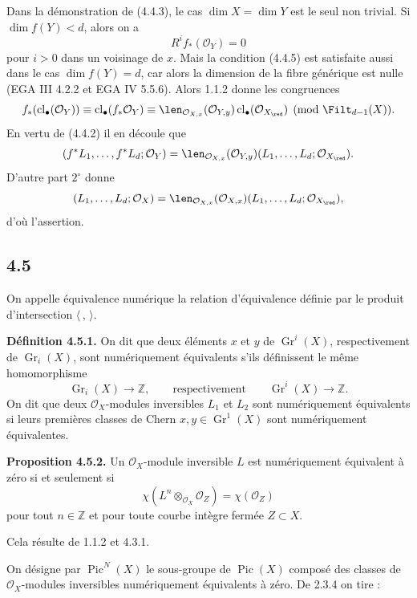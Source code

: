 \documentclass[11pt]{article}
\newcommand{\Gr}{\operatorname{Gr}}
\newcommand{\cl}{\operatorname{cl}}
\providecommand{\Pic}{\operatorname{Pic}}
\providecommand{\Gr}{\operatorname{Gr}}
\providecommand{\Gr}{\operatorname{G}}
\begin{document}
Dans la démonstration de (4.4.3), le cas \(\dim X=\dim Y\) est le seul non trivial. Si \(\dim f(Y)<d\), alors on a
\begin{equation}\tag{4.4.5}
 R^if_*(\mathcal O_Y)=0
\end{equation}
pour \(i>0\) dans un voisinage de \(x\). Mais la condition (4.4.5) est satisfaite aussi dans le cas \(\dim f(Y)=d\), car alors la dimension de la fibre générique est nulle (EGA III 4.2.2 et EGA IV 5.5.6). Alors 1.1.2 donne les congruences
\[
 f_*(\cl_\bullet(\mathcal O_Y))
 \equiv \cl_\bullet(f_*\mathcal O_Y)
 \equiv
 \len_{\mathcal O_{X,x}}(\mathcal O_{Y,y})
 \cl_\bullet(\mathcal O_{X_{\red}})
 \pmod{\Filt_{d-1}(X)}.
\]
En vertu de (4.4.2) il en découle que
\[
 (f^*L_1,\ldots,f^*L_d;\mathcal O_Y)
 =
 \len_{\mathcal O_{X,x}}(\mathcal O_{Y,y})
 (L_1,\ldots,L_d;\mathcal O_{X_{\red}}).
\]
D'autre part \(2^\circ\) donne
\[
 (L_1,\ldots,L_d;\mathcal O_X)
 =
 \len_{\mathcal O_{X,x}}(\mathcal O_{X,x})
 (L_1,\ldots,L_d;\mathcal O_{X_{\red}}),
\]
d'où l'assertion.

\subsection*{4.5}
On appelle équivalence numérique la relation d'équivalence définie par le produit d'intersection \(\langle\, ,\,\rangle\).

\textbf{Définition 4.5.1.} On dit que deux éléments \(x\) et \(y\) de \(\Gr^i(X)\), respectivement de \(\Gr_i(X)\), sont numériquement équivalents s'ils définissent le même homomorphisme
\[
 \Gr_i(X)\longrightarrow\mathbb Z,
 \qquad\text{respectivement}\qquad
 \Gr^i(X)\longrightarrow\mathbb Z.
\]
On dit que deux \(\mathcal O_X\)-modules inversibles \(L_1\) et \(L_2\) sont numériquement équivalents si leurs premières classes de Chern \(x,y\in\Gr^1(X)\) sont numériquement équivalentes.

\textbf{Proposition 4.5.2.} Un \(\mathcal O_X\)-module inversible \(L\) est numériquement équivalent à zéro si et seulement si
\begin{equation}\tag{4.5.3}
 \chi(L^n\otimes_{\mathcal O_X}\mathcal O_Z)=\chi(\mathcal O_Z)
\end{equation}
pour tout \(n\in\mathbb Z\) et pour toute courbe intègre fermée \(Z\subset X\).

Cela résulte de 1.1.2 et 4.3.1.

On désigne par \(\Pic^N(X)\) le sous-groupe de \(\Pic(X)\) composé des classes de \(\mathcal O_X\)-modules inversibles numériquement équivalents à zéro. De 2.3.4 on tire :
\end{document}
